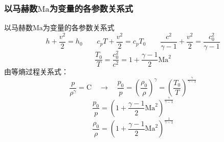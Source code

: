 \subsubsection{以马赫数$\mathrm{Ma}$为变量的各参数关系式}
\begin{frame}{以马赫数$\mathrm{Ma}$为变量的各参数关系式}
  \vspace*{-1em}
  \begin{equation*}
    h
    +
    \frac{v^{2}}{2}
    =
    h_{0}
    \quad\quad
    c_{p}T
    +
    \frac{v^{2}}{2}
    =
    c_{p}T_{0}
    \quad\quad
    \frac{c^{2}}{\gamma-1}
    +
    \frac{v^{2}}{2}
    =
    \frac{c_{0}^{2}}{\gamma-1}
  \end{equation*}
  \begin{equation*}
    \frac{T_{0}}{T}
    =
    \frac{c_{0}^{2}}{c^{2}}
    =
    1
    +
    \frac{\gamma-1}{2}\mathrm{Ma}^{2}
  \end{equation*}
  由等熵过程关系式：
  \begin{equation*}
    \frac{p}{\rho^{\gamma}}
    =
    \mathrm{C}
    \quad
    \rightarrow
    \quad
    \frac{p_{0}}{p}
    =
    \left(\frac{\rho_{0}}{\rho}\right)^{\gamma}
    =
    \left(\frac{T_{0}}{T}\right)^{\frac{\gamma}{\gamma-1}}
  \end{equation*}
  \begin{equation*}
    \frac{p_{0}}{p}
    =
    \left(1+\frac{\gamma-1}{2}\mathrm{Ma}^{2}\right)^{\frac{\gamma}{\gamma-1}}
  \end{equation*}
  \begin{equation*}
    \frac{\rho_{0}}{\rho}
    =
    \left(1+\frac{\gamma-1}{2}\mathrm{Ma}^{2}\right)^{\frac{1}{\gamma-1}}
  \end{equation*}
\end{frame}

